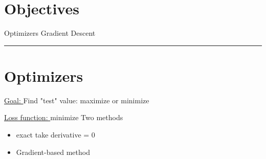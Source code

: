 


\section*{Objectives}
\begin{outline}
    \1 Optimizers
    \1 Gradient Descent
\end{outline}

\rule[0.0051in]{\textwidth}{0.00025in}

\section*{Optimizers}

\underline{Goal: } Find "test" value: maximize or minimize

\underline{Loss function: } minimize
Two methods
\begin{itemize}
    \item exact take derivative = 0
    \item  Gradient-based method
\end{itemize}




